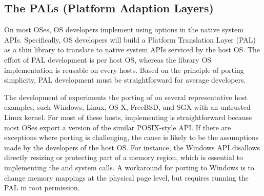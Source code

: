 \subsection{The PALs (Platform Adaption Layers)}
\label{sec:overview:host:pal}


On most OSes, OS developers
implement \thehostabi{} using options in the native system APIs.
Specifically,
OS developers will build
a Platform Translation Layer (PAL)
as a thin library to translate \hostapis{} to native system APIs
serviced by the host OS.
The effort of PAL development is per host OS, whereas the library OS implementation is reusable on every hosts. %
Based on the principle of porting simplicity, PAL development must be straightforward
for average developers.




The development of \graphene{} experiments the porting of \thehostabi{}
on several representative host examples, such Windows, Linux, OS X, FreeBSD, and SGX with an untrusted Linux kernel.
For most of these hosts,
implementing \thehostabi{} is straightforward because most OSes export a version of the similar POSIX-style API.
If there are exceptions where porting \thehostabi{} is challenging,
the cause is likely to be the assumptions made by the developers of the host OS.
For instance, the Windows API disallows directly resizing or protecting part of a memory region, which is essential to implementing the  and  system calls.
A workaround for porting \thehostabi{} to Windows is to change memory mappings at the physical page level,
but requires running the PAL in root permission.




